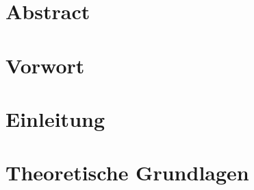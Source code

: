 \section*{Abstract}



\newpage


\section*{Vorwort}



\newpage


\tableofcontents 

\newpage 


\section{Einleitung} 



\newpage


\section{Theoretische Grundlagen} %




\newpage



